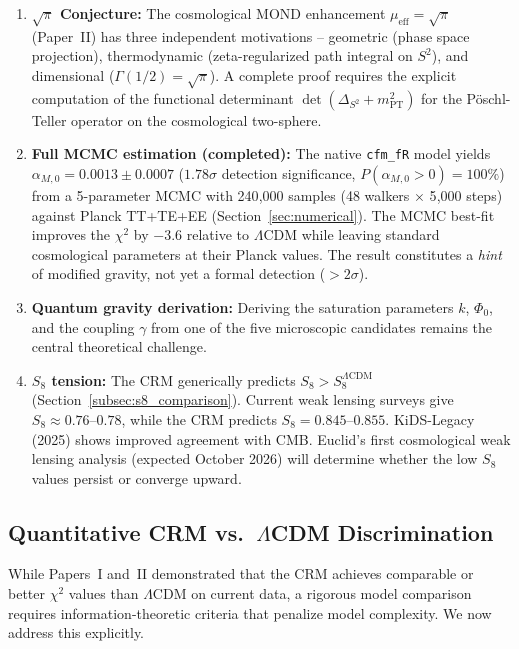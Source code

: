 \documentclass[aps,prd,twocolumn,superscriptaddress,nofootinbib]{revtex4-2}
\begin{document}
\begin{enumerate}
\item \textbf{$\sqrt{\pi}$ Conjecture:} The cosmological MOND enhancement $\mu_{\mathrm{eff}} = \sqrt{\pi}$ (Paper~II) has three independent motivations -- geometric (phase space projection), thermodynamic (zeta-regularized path integral on $S^2$), and dimensional ($\Gamma(1/2) = \sqrt{\pi}$). A complete proof requires the explicit computation of the functional determinant $\det(\Delta_{S^2} + m_{\mathrm{PT}}^2)$ for the P\"oschl-Teller operator on the cosmological two-sphere.

\item \textbf{Full MCMC estimation (completed):} The native \texttt{cfm\_fR} model yields $\alpha_{M,0} = 0.0013 \pm 0.0007$ ($1.78\sigma$ detection significance, $P(\alpha_{M,0} > 0) = 100\%$) from a 5-parameter MCMC with 240{,}000 samples (48 walkers $\times$ 5{,}000 steps) against Planck TT+TE+EE (Section~\ref{sec:numerical}). The MCMC best-fit improves the $\chi^2$ by $-3.6$ relative to $\Lambda$CDM while leaving standard cosmological parameters at their Planck values. The result constitutes a \textit{hint} of modified gravity, not yet a formal detection ($> 2\sigma$).

\item \textbf{Quantum gravity derivation:} Deriving the saturation parameters $k$, $\Phi_0$, and the coupling $\gamma$ from one of the five microscopic candidates remains the central theoretical challenge.

\item \textbf{$S_8$ tension:} The CRM generically predicts $S_8 > S_8^{\Lambda\mathrm{CDM}}$ (Section~\ref{subsec:s8_comparison}). Current weak lensing surveys give $S_8 \approx 0.76$--$0.78$, while the CRM predicts $S_8 = 0.845$--$0.855$. KiDS-Legacy (2025) shows improved agreement with CMB. Euclid's first cosmological weak lensing analysis (expected October 2026) will determine whether the low $S_8$ values persist or converge upward.
\end{enumerate}

\subsection{Quantitative CRM vs.\ $\Lambda$CDM Discrimination}
\label{subsec:discrimination}

While Papers~I and~II demonstrated that the CRM achieves comparable or better $\chi^2$ values than $\Lambda$CDM on current data, a rigorous model comparison requires information-theoretic criteria that penalize model complexity. We now address this explicitly.
\end{document}
